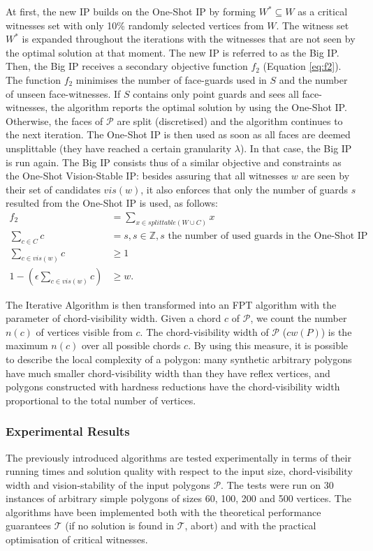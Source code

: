 At first, the new IP builds on the One-Shot IP by forming $W^* \subseteq W$ as a critical witnesses set with only 10\% randomly selected vertices from $W$. The witness set $W^*$ is expanded throughout the iterations with the witnesses that are not seen by the optimal solution at that moment. The new IP is referred to as the Big IP.
Then, the Big IP receives a secondary objective function $f_2$ (Equation \ref{eq:f2}). The function $f_2$ minimises the number of face-guards used in $S$ and the number of unseen face-witnesses. If $S$ contains only point guards and sees all face-witnesses, the algorithm reports the optimal solution by using the One-Shot IP. Otherwise, the faces of $\mathcal P$ are split (discretised) and the algorithm continues to the next iteration. The One-Shot IP is then used as soon as all faces are deemed unsplittable (they have reached a certain granularity $\lambda$). In that case, the Big IP is run again. The Big IP consists thus of a similar objective and constraints as the One-Shot Vision-Stable IP: besides assuring that all witnesses $w$ are seen by their set of candidates $vis(w)$, it also enforces that only the number of guards $s$ resulted from the One-Shot IP is used, as follows: 
\begin{align}
	f_2 &= \sum_{x \in splittable(W \cup C)} x \label{eq:f2}\\
	\sum_{c \in C} c &= s, s \in \mathbb Z, s \text{ the number of used guards in the One-Shot IP} \\
	\sum_{c \in vis(w)} c &\geq 1 \\
	1 - (\epsilon \sum_{c \in vis(w)} c) &\geq w.
\end{align}

The Iterative Algorithm is then transformed into an FPT algorithm with the parameter of chord-visibility width. Given a chord $c$ of $\mathcal P$, we count the number $n(c)$ of vertices visible from $c$. The chord-visibility width of $\mathcal P$ ($cw(P)$)  is the maximum $n(c)$ over all possible chords $c$. By using this measure, it is possible to describe the local complexity of a polygon: many synthetic arbitrary polygons have much smaller chord-visibility width than they have reflex vertices, and polygons constructed with hardness reductions have the chord-visibility width proportional to the total number of vertices. 

\subsubsection{Experimental Results}
The previously introduced algorithms are tested experimentally in terms of their running times and solution quality with respect to the input size, chord-visibility width and vision-stability of the input polygons $\mathcal P$. The tests were run on 30 instances of arbitrary simple polygons of sizes 60, 100, 200 and 500 vertices. The algorithms have been implemented both with the theoretical performance guarantees $\mathcal T$ (if no solution is found in $\mathcal T$, abort) and with the practical optimisation of critical witnesses.

